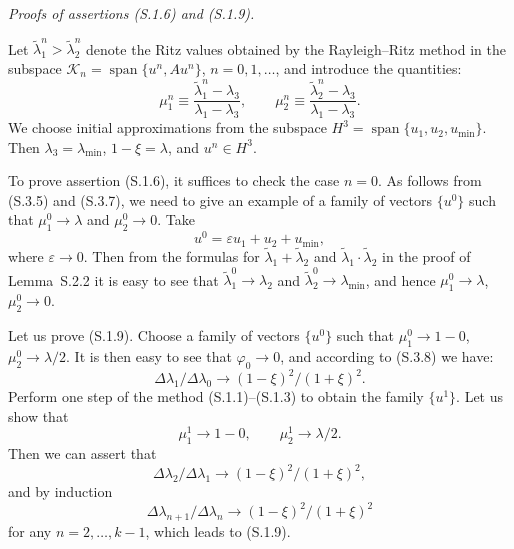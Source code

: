 \documentclass[11pt,oneside]{book}
\newcommand{\myspan}{\operatorname{span}}
\begin{document}
\textit{Proofs of assertions (S.1.6) and (S.1.9).}

Let $\tilde{\lambda}_1^n > \tilde{\lambda}_2^n$ denote the Ritz values obtained by the Rayleigh--Ritz method in the subspace $\mathcal{K}_n = \myspan\{u^n, A u^n\}$, $n = 0, 1, \dots$, and introduce the quantities:
\[
\mu_1^n \equiv \frac{\tilde{\lambda}_1^n - \lambda_3}{\lambda_1 - \lambda_3}, \qquad \mu_2^n \equiv \frac{\tilde{\lambda}_2^n - \lambda_3}{\lambda_1 - \lambda_3}.
\]
We choose initial approximations from the subspace $H^3 = \myspan\{u_1, u_2, u_{\min}\}$. Then $\lambda_3 = \lambda_{\min}$, $1 - \xi = \lambda$, and $u^n \in H^3$.

To prove assertion (S.1.6), it suffices to check the case $n = 0$. As follows from (S.3.5) and (S.3.7), we need to give an example of a family of vectors $\{u^0\}$ such that $\mu_1^0 \to \lambda$ and $\mu_2^0 \to 0$. Take
\[
u^0 = \varepsilon u_1 + u_2 + u_{\min},
\]
where $\varepsilon \to 0$. Then from the formulas for $\tilde{\lambda}_1 + \tilde{\lambda}_2$ and $\tilde{\lambda}_1 \cdot \tilde{\lambda}_2$ in the proof of Lemma~S.2.2 %
it is easy to see that $\tilde{\lambda}_1^0 \to \lambda_2$ and $\tilde{\lambda}_2^0 \to \lambda_{\min}$, and hence $\mu_1^0 \to \lambda$, $\mu_2^0 \to 0$.

Let us prove (S.1.9). Choose a family of vectors $\{u^0\}$ such that $\mu_1^0 \to 1 - 0$, $\mu_2^0 \to \lambda/2$. It is then easy to see that $\varphi_0 \to 0$, and according to (S.3.8) we have:
\[
\Delta\lambda_1 / \Delta\lambda_0 \to (1 - \xi)^2 / (1 + \xi)^2.
\]
Perform one step of the method (S.1.1)--(S.1.3) to obtain the family $\{u^1\}$. Let us show that
\[
\mu_1^1 \to 1 - 0, \qquad \mu_2^1 \to \lambda/2.
\]
Then we can assert that
\[
\Delta\lambda_2 / \Delta\lambda_1 \to (1 - \xi)^2 / (1 + \xi)^2,
\]
and by induction
\[
\Delta\lambda_{n+1} / \Delta\lambda_n \to (1 - \xi)^2 / (1 + \xi)^2
\]
for any $n = 2, \dots, k - 1$, which leads to (S.1.9).
\end{document}
